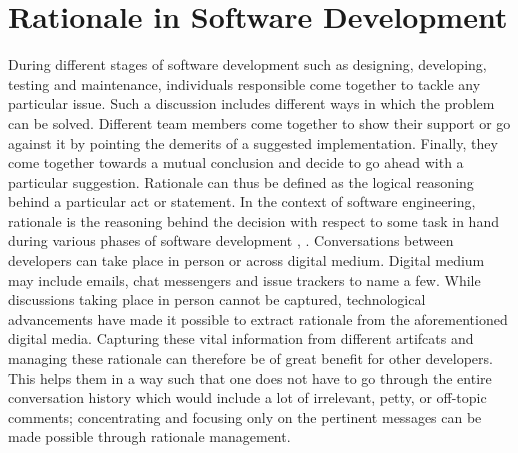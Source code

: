 \documentclass[a4paper,12pt,twoside]{report}
\begin{document}
\section{Rationale in Software Development}

During different stages of software development such as designing, developing, testing and maintenance, individuals responsible come together to tackle any particular issue. Such a discussion includes different ways in which the problem can be solved. Different team members come together to show their support or go against it by pointing the demerits of a suggested implementation. Finally, they come together towards a mutual conclusion and decide to go ahead with a particular suggestion. Rationale can thus be defined as the logical reasoning behind a particular act or statement. In the context of software engineering, rationale is the reasoning behind the decision with respect to some task in hand during various phases of software development \cite{Dutoit2006}, \cite{Bruegge2009}. 
\newline \newline
Conversations between developers can take place in person or across digital medium. Digital medium may include emails, chat messengers and issue trackers to name a few. While discussions taking place in person cannot be captured, technological advancements have made it possible to extract rationale from the aforementioned digital media. Capturing these vital information from different artifcats and managing these rationale can therefore be of great benefit for other developers. This helps them in a way such that one does not have to go through the entire conversation history which would include a lot of irrelevant, petty, or off-topic comments; concentrating and focusing only on the pertinent messages can be made possible through rationale management. 
\newline \newline
\end{document}
